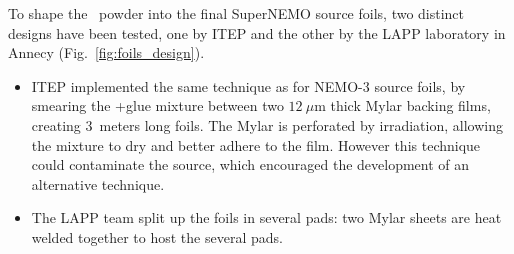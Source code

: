 To shape the \Se\ powder into the final SuperNEMO source foils, two distinct designs have been tested, one by ITEP and the other by the LAPP laboratory in Annecy (Fig.~\ref{fig:foils_design}).
\begin{itemize}
\item ITEP implemented the same technique as for NEMO-$3$ source foils, by smearing the \Se+glue mixture between two $12~\mu$m thick Mylar backing films, creating $3$~meters long foils.
  The Mylar is perforated by irradiation, allowing the mixture to dry and better adhere to the film.
  However this technique could contaminate the source, which encouraged the development of an alternative technique.
\item The LAPP team split up the foils in several pads: two Mylar sheets are heat welded together to host the several pads.
\end{itemize}
